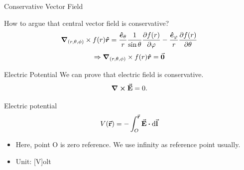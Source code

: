 \documentclass{beamer}
\begin{document}
\begin{frame}{Conservative Vector Field}
    \begin{block}{How to argue that central vector field is conservative?}
        \begin{equation}
            \grad_{(r,\theta,\phi)} \times f(r)\vu*{r} = \frac{\vu*{e}_{\theta}}{r}\frac{1}{\sin \theta} \frac{\partial f(r)}{\partial \varphi}
            -\frac{\vu*{e}_{\varphi}}{r}\frac{\partial f(r)}{\partial \theta}
        \end{equation}
        \begin{equation*}
            \Rightarrow \grad_{(r,\theta,\phi)} \times f(r)\vu*{r} = \va*{0}
        \end{equation*}
    \end{block}


\end{frame}


\begin{frame}{Electric Potential}
    We can prove that electric field is conservative.
    \begin{equation}
        \curl{\va{E}} = 0.
    \end{equation}

    \begin{block}{Electric potential}
        \begin{equation}
            V(\va{r}) = -\int_O^{\va{r}} \va{E} \vdot \dd{\va{l}}
        \end{equation}

        \begin{itemize}
            \item Here, point O is zero reference. We use infinity as reference point usually.
            \item Unit: [V]olt
        \end{itemize}
    \end{block}
\end{frame}
\end{document}
